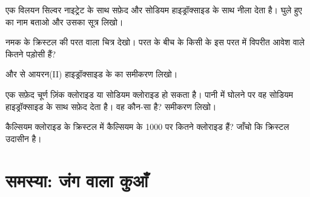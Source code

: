 \begin{exercise}[$\star\star$]\label{exo:g9:ions:8}
एक विलयन सिल्वर नाइट्रेट के साथ सफ़ेद  और सोडियम हाइड्रॉक्साइड के साथ
नीला  देता है। घुले हुए  का नाम बताओ और उसका
सूत्र लिखो।
\end{exercise}

\begin{exercise}[$\star\star$]\label{exo:g9:ions:9}
नमक के क्रिस्टल की परत वाला चित्र देखो। परत के बीच के किसी  के इस परत में
विपरीत आवेश वाले कितने पड़ोसी हैं?
\end{exercise}

\begin{exercise}[$\star\star$]\label{exo:g9:ions:10}
 और   से आयरन(II) हाइड्रॉक्साइड के
 का समीकरण लिखो।
\end{exercise}

\begin{exercise}[$\star\star\star$]\label{exo:g9:ions:11}
एक सफ़ेद चूर्ण ज़िंक क्लोराइड या सोडियम क्लोराइड हो सकता है। पानी में घोलने
पर वह सोडियम हाइड्रॉक्साइड के साथ सफ़ेद  देता है। वह कौन-सा है?
समीकरण लिखो।
\end{exercise}

\begin{exercise}[$\star\star\star$]\label{exo:g9:ions:12}
कैल्सियम क्लोराइड के क्रिस्टल में कैल्सियम के 1000  पर कितने क्लोराइड
 हैं? जाँचो कि क्रिस्टल उदासीन है।
\end{exercise}

\section{समस्या: जंग वाला कुआँ}

